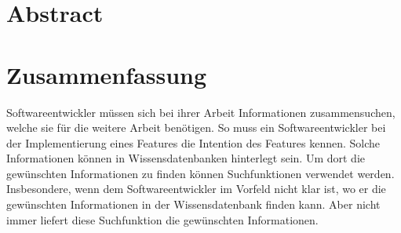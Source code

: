 %
%
%
%
%
%
%
%
\section*{Abstract}

%
%
%
\section*{Zusammenfassung}
Softwareentwickler müssen sich bei ihrer Arbeit Informationen zusammensuchen, welche sie für die weitere Arbeit benötigen.
So muss ein Softwareentwickler bei der Implementierung eines Features die Intention des Features kennen.
Solche Informationen können in Wissensdatenbanken hinterlegt sein.
Um dort die gewünschten Informationen zu finden können Suchfunktionen verwendet werden.
Insbesondere, wenn dem Softwareentwickler im Vorfeld nicht klar ist, wo er die gewünschten Informationen in der Wissensdatenbank finden kann.
Aber nicht immer liefert diese Suchfunktion die gewünschten Informationen.\\

